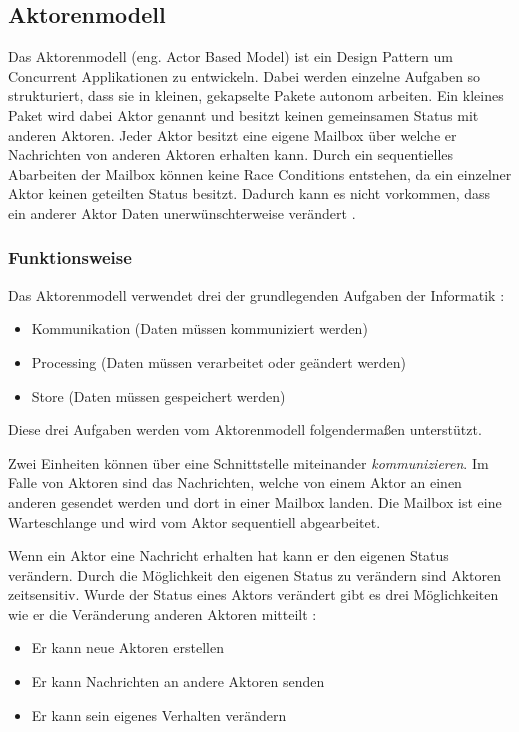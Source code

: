 \subsection{Aktorenmodell}
\label{section:Actor Based Model}

Das Aktorenmodell (eng. Actor Based Model) ist ein Design Pattern um Concurrent Applikationen zu entwickeln. Dabei werden einzelne Aufgaben so strukturiert, dass sie in kleinen, gekapselte Pakete autonom arbeiten. Ein kleines Paket wird dabei Aktor genannt und besitzt keinen gemeinsamen Status mit anderen Aktoren. Jeder Aktor besitzt eine eigene Mailbox über welche er Nachrichten von anderen Aktoren erhalten kann. Durch ein sequentielles Abarbeiten der Mailbox können keine Race Conditions entstehen, da ein einzelner Aktor keinen geteilten Status besitzt. Dadurch kann es nicht vorkommen, dass ein anderer Aktor Daten unerwünschterweise verändert \cite[p. 84]{Erb2012}. 

\subsubsection{Funktionsweise}

Das Aktorenmodell verwendet drei der grundlegenden Aufgaben der Informatik \cite[p. 85]{Erb2012}:

\begin{itemize}
  \item Kommunikation (Daten müssen kommuniziert werden)
  \item Processing (Daten müssen verarbeitet oder geändert werden)
  \item Store (Daten müssen gespeichert werden)
\end{itemize}

Diese drei Aufgaben werden vom Aktorenmodell folgendermaßen unterstützt.

Zwei Einheiten können über eine Schnittstelle miteinander \emph{kommunizieren}. Im Falle von Aktoren sind das Nachrichten, welche von einem Aktor an einen anderen gesendet werden und dort in einer Mailbox landen. Die Mailbox ist eine Warteschlange und wird vom Aktor sequentiell abgearbeitet. 

Wenn ein Aktor eine Nachricht erhalten hat kann er den eigenen Status verändern. Durch die Möglichkeit den eigenen Status zu verändern sind Aktoren zeitsensitiv. Wurde der Status eines Aktors verändert gibt es drei Möglichkeiten wie er die Veränderung anderen Aktoren mitteilt \cite[p. 84]{Erb2012}:

\begin{itemize}
  \item Er kann neue Aktoren erstellen
  \item Er kann Nachrichten an andere Aktoren senden
  \item Er kann sein eigenes Verhalten verändern
\end{itemize}

